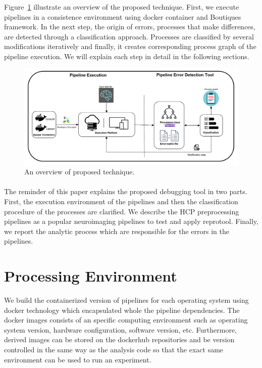 \documentclass{article}
\begin{document}
{Figure~\ref{fig:overview} illustrate an overview of the proposed 
technique. First, we execute pipelines in a consistence environment 
using docker container and Boutiques framework. In the next step, the 
origin of errors, processes that make differences, are detected through 
a classification approach. Processes are classified by several 
modifications iteratively and finally, it creates corresponding process 
graph of the pipeline execution. We will explain each step in detail in 
the following sections.

\begin{figure}[H]
\centering
  \includegraphics[scale=0.5]{images/overview.png}
  \caption{An overview of proposed technique.}
  \label{fig:overview}
\end{figure}

\paragraph{} The reminder of this paper explains the proposed debugging tool in two 
parts. First, the execution environment of the pipelines and then the 
classification procedure of the processes are clarified. We describe 
the HCP preprocessing pipelines as a popular neuroimaging pipelines to 
test and apply reprotool. Finally, we report the analytic process which 
are responsible for the errors in the pipelines.

\section{Processing Environment}

We build the containerized version of pipelines for each operating 
system using docker technology which encapsulated whole the pipeline 
dependencies. The docker images consists of an specific computing 
environment such as operating system version, hardware configuration, 
software version, etc. Furthermore, derived images can be stored on 
the dockerhub repositories and be version controlled in the same way as 
the analysis code so that the exact same environment can be used to run 
an experiment.

}
\end{document}
